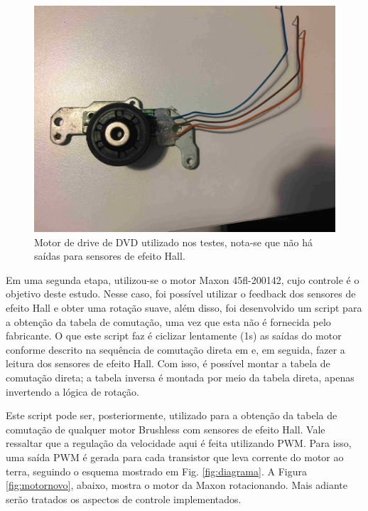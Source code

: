 \documentclass[10pt,fleqn,a4paper]{article}
\begin{document}
	\begin{figure}[ht]
		\begin{center}
			\includegraphics[angle=0, scale=0.06]{images/motorantigo}
		\end{center}
		\caption{Motor de drive de DVD utilizado nos testes, nota-se que não há saídas para sensores de efeito Hall.}
		\label{fig:motorantigo}
	\end{figure}
    
    Em uma segunda etapa, utilizou-se o motor Maxon 45fl-200142, cujo controle é o objetivo deste estudo. Nesse caso, foi possível utilizar o feedback dos sensores de efeito Hall e obter uma rotação suave, além disso, foi desenvolvido um script para a obtenção da tabela de comutação, uma vez que esta não é fornecida pelo fabricante. O que este script faz é ciclizar lentamente (1s) as saídas do motor conforme descrito na sequência de comutação direta em \cite{atmeldiagrama} e, em seguida, fazer a leitura dos sensores de efeito Hall. Com isso, é possível montar a tabela de comutação direta; a tabela inversa é montada por meio da tabela direta, apenas invertendo a lógica de rotação.
    
    Este script pode ser, posteriormente, utilizado para a obtenção da tabela de comutação de qualquer motor Brushless com sensores de efeito Hall. Vale ressaltar que a regulação da velocidade aqui é feita utilizando PWM. Para isso, uma saída PWM é gerada para cada transistor que leva corrente do motor ao terra, seguindo o esquema mostrado em Fig. \ref{fig:diagrama}.
    A Figura \ref{fig:motornovo}, abaixo, mostra o motor da Maxon rotacionando. Mais adiante serão tratados os aspectos de controle implementados.
\end{document}
